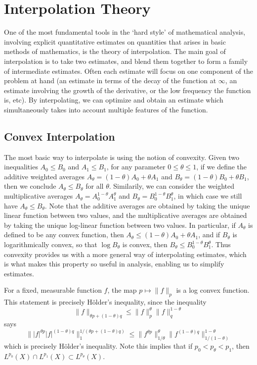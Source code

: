 \chapter{Interpolation Theory}

One of the most fundamental tools in the `hard style' of mathematical analysis, involving explicit quantitative estimates on quantities that arises in basic methods of mathematics, is the theory of interpolation. The main goal of interpolation is to take two estimates, and blend them together to form a family of intermediate estimates. Often each estimate will focus on one component of the problem at hand (an estimate in terms of the decay of the function at $\infty$, an estimate involving the growth of the derivative, or the low frequency the function is, etc). By interpolating, we can optimize and obtain an estimate which simultaneously takes into account multiple features of the function.

\section{Convex Interpolation}

The most basic way to interpolate is using the notion of convexity. Given two inequalities $A_0 \leq B_0$ and $A_1 \leq B_1$, for any parameter $0 \leq \theta \leq 1$, if we define the additive weighted averages $A_\theta = (1 - \theta) A_0 + \theta A_1$ and $B_\theta = (1 - \theta) B_0 + \theta B_1$, then we conclude $A_\theta \leq B_\theta$ for all $\theta$. Similarily, we can consider the weighted multiplicative averages $A_\theta = A_0^{1 - \theta} A_1^\theta$ and $B_\theta = B_0^{1 - \theta}B_1^\theta$, in which case we still have $A_\theta \leq B_\theta$. Note that the additive averages are obtained by taking the unique linear function between two values, and the multiplicative averages are obtained by taking the unique log-linear function between two values. In particular, if $A_\theta$ is defined to be any convex function, then $A_\theta \leq (1 - \theta) A_0 + \theta A_1$, and if $B_\theta$ is logarithmically convex, so that $\log B_\theta$ is convex, then $B_\theta \leq B_0^{1 - \theta} B_1^\theta$. Thus convexity provides us with a more general way of interpolating estimates, which is what makes this property so useful in analysis, enabling us to simplify estimates.

\begin{example}
	For a fixed, measurable function $f$, the map $p \mapsto \| f \|_p$ is a log convex function. This statement is precisely H\"{o}lder's inequality, since the inequality
	\[ \| f \|_{\theta p + (1 - \theta) q} \leq \| f \|_p^\theta \| f \|_{q}^{1-\theta} \]
	says
	\[ \| |f|^{\theta p} |f|^{(1 - \theta) q} \|_1^{1/(\theta p + (1 - \theta) q)} \leq \| f^{\theta p} \|_{1/\theta}^{\theta} \| f^{(1-\theta)q} \|_{1/(1-\theta)}^{1-\theta} \]
	which is precisely H\"{o}lder's inequality. Note this implies that if $p_0 < p_\theta < p_1$, then $L^{p_0}(X) \cap L^{p_1}(X) \subset L^{p_\theta}(X)$.
\end{example}

